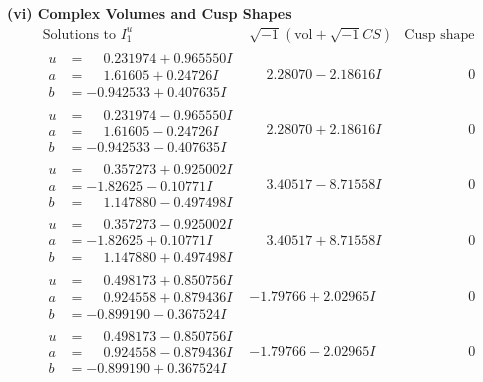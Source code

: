 \documentclass[1p]{elsarticle_modified}
\theoremstyle{definition}
\newcommand{\I}{\sqrt{-1}}
\begin{document}
\newpage\flushleft \textbf{(vi) Complex Volumes and Cusp Shapes}
$$\begin{array}{c|c|c}  
\text{Solutions to }I^u_{1}& \I (\text{vol} + \sqrt{-1}CS) & \text{Cusp shape}\\
 \hline 
\begin{aligned}
u &= \phantom{-}0.231974 + 0.965550 I \\
a &= \phantom{-}1.61605 + 0.24726 I \\
b &= -0.942533 + 0.407635 I\end{aligned}
 & \phantom{-}2.28070 - 2.18616 I & \phantom{-0.000000 } 0 \\ \hline\begin{aligned}
u &= \phantom{-}0.231974 - 0.965550 I \\
a &= \phantom{-}1.61605 - 0.24726 I \\
b &= -0.942533 - 0.407635 I\end{aligned}
 & \phantom{-}2.28070 + 2.18616 I & \phantom{-0.000000 } 0 \\ \hline\begin{aligned}
u &= \phantom{-}0.357273 + 0.925002 I \\
a &= -1.82625 - 0.10771 I \\
b &= \phantom{-}1.147880 - 0.497498 I\end{aligned}
 & \phantom{-}3.40517 - 8.71558 I & \phantom{-0.000000 } 0 \\ \hline\begin{aligned}
u &= \phantom{-}0.357273 - 0.925002 I \\
a &= -1.82625 + 0.10771 I \\
b &= \phantom{-}1.147880 + 0.497498 I\end{aligned}
 & \phantom{-}3.40517 + 8.71558 I & \phantom{-0.000000 } 0 \\ \hline\begin{aligned}
u &= \phantom{-}0.498173 + 0.850756 I \\
a &= \phantom{-}0.924558 + 0.879436 I \\
b &= -0.899190 - 0.367524 I\end{aligned}
 & -1.79766 + 2.02965 I & \phantom{-0.000000 } 0 \\ \hline\begin{aligned}
u &= \phantom{-}0.498173 - 0.850756 I \\
a &= \phantom{-}0.924558 - 0.879436 I \\
b &= -0.899190 + 0.367524 I\end{aligned}
 & -1.79766 - 2.02965 I & \phantom{-0.000000 } 0 \\ \hline\begin{aligned}

\end{aligned}
\end{array}$$
\end{document}
